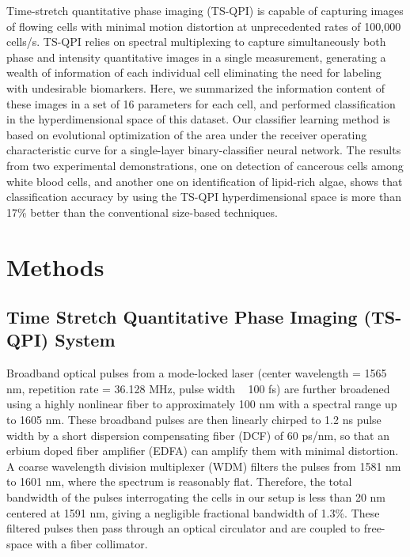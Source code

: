 \documentclass[aps,pra,reprint,superscriptaddress]{revtex4-1}
\begin{document}
Time-stretch quantitative phase imaging (TS-QPI) is capable of capturing images of flowing cells with minimal motion distortion at unprecedented rates of 100,000 cells/s. TS-QPI relies on spectral multiplexing to capture simultaneously both phase and intensity quantitative images in a single measurement, generating a wealth of information of each individual cell eliminating the need for labeling with undesirable biomarkers. Here, we summarized the information content of these images in a set of 16 parameters for each cell, and performed classification in the hyperdimensional space of this dataset. Our classifier learning method is based on evolutional optimization of the area under the receiver operating characteristic curve for a single-layer binary-classifier neural network. The results from two experimental demonstrations, one on detection of cancerous cells among white blood cells, and another one on identification of lipid-rich algae, shows that classification accuracy by using the TS-QPI hyperdimensional space is more than 17\% better than the conventional size-based techniques.

\section{\label{scn:Methods} Methods}

\subsection{Time Stretch Quantitative Phase Imaging (TS-QPI) System}

Broadband optical pulses from a mode-locked laser (center wavelength = 1565 nm, repetition rate = 36.128 MHz, pulse width ~ 100 fs) are further broadened using a highly nonlinear fiber to approximately 100 nm with a spectral range up to 1605 nm. These broadband pulses are then linearly chirped to 1.2 ns pulse width by a short dispersion compensating fiber (DCF) of 60 ps/nm, so that an erbium doped fiber amplifier (EDFA) can amplify them with minimal distortion. A coarse wavelength division multiplexer (WDM) filters the pulses from 1581 nm to 1601 nm, where the spectrum is reasonably flat. Therefore, the total bandwidth of the pulses interrogating the cells in our setup is less than 20 nm centered at 1591 nm, giving a negligible fractional bandwidth of 1.3\%. These filtered pulses then pass through an optical circulator and are coupled to free-space with a fiber collimator.
\end{document}

